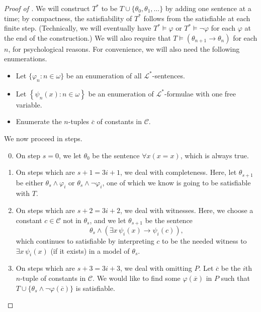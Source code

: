 \documentclass[../notes.tex]{subfiles}
\begin{document}
\begin{proof}[Proof of ]
	We will construct $T^*$ to be $T\cup\{\theta_0,\theta_1,\ldots\}$ by adding one sentence at a time; by compactness, the satisfiability of $T^*$ follows from the satisfiable at each finite step. (Technically, we will eventually have $T^*\models\varphi$ or $T^*\models\lnot\varphi$ for each $\varphi$ at the end of the construction.) We will also require that $T\models(\theta_{n+1}\to\theta_n)$ for each $n$, for psychological reasons. For convenience, we will also need the following enumerations.
	\begin{itemize}
		\item Let $\{\varphi_n:n\in\omega\}$ be an enumeration of all $\mathcal L^*$-sentences.
		\item Let $\left\{\psi_n(x):n\in\omega\right\}$ be an enumeration of $\mathcal L^*$-formulae with one free variable.
		\item Enumerate the $n$-tuples $\overline c$ of constants in $\mathcal C$.
	\end{itemize}
	We now proceed in steps.
	\begin{enumerate}
		\setcounter{enumi}{-1}
		\item On step $s=0$, we let $\theta_0$ be the sentence $\forall x(x=x)$, which is always true.
		\item On steps which are $s+1=3i+1$, we deal with completeness. Here, let $\theta_{s+1}$ be either $\theta_s\land\varphi_i$ or $\theta_s\land\lnot\varphi_i$, one of which we know is going to be satisfiable with $T$.
		\item On steps which are $s+2=3i+2$, we deal with witnesses. Here, we choose a constant $c\in\mathcal C$ not in $\theta_s$, and we let $\theta_{s+1}$ be the sentence
		\[\theta_{s}\land\left(\exists x\,\psi_i(x)\to\psi_i(c)\right),\]
		which continues to satisfiable by interpreting $c$ to be the needed witness to $\exists x\,\psi_i(x)$ (if it exists) in a model of $\theta_s$.
		\item On steps which are $s+3=3i+3$, we deal with omitting $P$. Let $\overline c$ be the $i$th $n$-tuple of constants in $\mathcal C$. We would like to find some $\varphi(\overline x)$ in $P$ such that $T\cup\{\theta_s\land\lnot\varphi(\overline c)\}$ is satisfiable.
		

\end{enumerate}
\end{proof}
\end{document}
